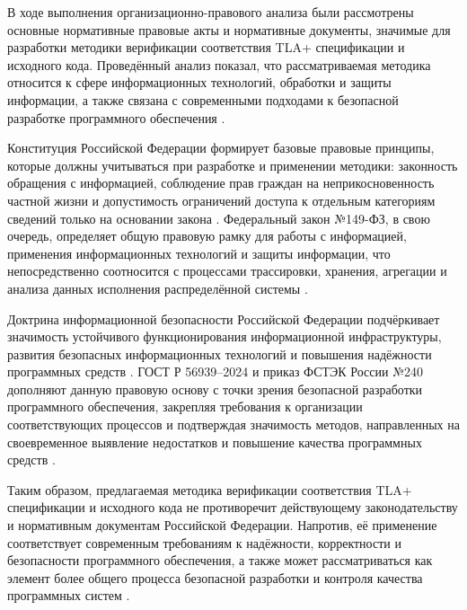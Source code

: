 \conclusion

В ходе выполнения организационно-правового анализа были рассмотрены
основные нормативные правовые акты и нормативные документы, значимые для
разработки методики верификации соответствия TLA+ спецификации и исходного
кода. Проведённый анализ показал, что рассматриваемая методика относится к
сфере информационных технологий, обработки и защиты информации, а также
связана с современными подходами к безопасной разработке программного
обеспечения \cite{constitution_rf,fz149_info,doctrine_ib_rf,gost_56939_2024,fstek_240_2023}.

Конституция Российской Федерации формирует базовые правовые принципы,
которые должны учитываться при разработке и применении методики:
законность обращения с информацией, соблюдение прав граждан на
неприкосновенность частной жизни и допустимость ограничений доступа к
отдельным категориям сведений только на основании закона
\cite{constitution_rf}. Федеральный закон №149-ФЗ, в свою очередь,
определяет общую правовую рамку для работы с информацией, применения
информационных технологий и защиты информации, что непосредственно
соотносится с процессами трассировки, хранения, агрегации и анализа данных
исполнения распределённой системы \cite{fz149_info}.

Доктрина информационной безопасности Российской Федерации подчёркивает
значимость устойчивого функционирования информационной инфраструктуры,
развития безопасных информационных технологий и повышения надёжности
программных средств \cite{doctrine_ib_rf}. ГОСТ Р 56939--2024 и приказ
ФСТЭК России №240 дополняют данную правовую основу с точки зрения
безопасной разработки программного обеспечения, закрепляя требования к
организации соответствующих процессов и подтверждая значимость методов,
направленных на своевременное выявление недостатков и повышение качества
программных средств \cite{gost_56939_2024,fstek_240_2023}.

Таким образом, предлагаемая методика верификации соответствия TLA+
спецификации и исходного кода не противоречит действующему
законодательству и нормативным документам Российской Федерации. Напротив,
её применение соответствует современным требованиям к надёжности,
корректности и безопасности программного обеспечения, а также может
рассматриваться как элемент более общего процесса безопасной разработки и
контроля качества программных систем
\cite{constitution_rf,fz149_info,doctrine_ib_rf,gost_56939_2024,fstek_240_2023}.
